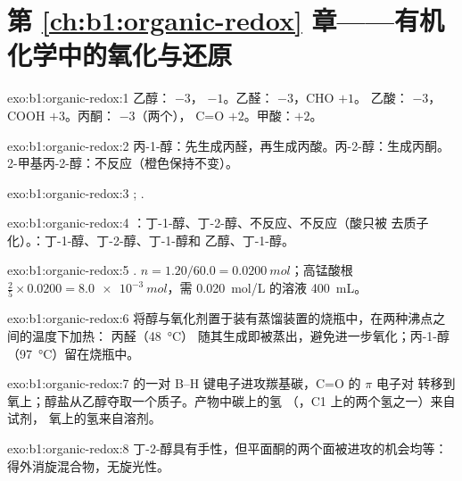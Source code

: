 \section*{第 \ref{ch:b1:organic-redox} 章——有机化学中的氧化与还原}

\begin{solution}{exo:b1:organic-redox:1}
乙醇： $-3$， $-1$。乙醛： $-3$，CHO $+1$。
乙酸： $-3$，COOH $+3$。丙酮： $-3$（两个），
C=O $+2$。甲酸：$+2$。
\end{solution}

\begin{solution}{exo:b1:organic-redox:2}
丙-1-醇：先生成丙醛，再生成丙酸。丙-2-醇：生成丙酮。
2-甲基丙-2-醇：不反应（橙色保持不变）。
\end{solution}

\begin{solution}{exo:b1:organic-redox:3}
;
.
\end{solution}

\begin{solution}{exo:b1:organic-redox:4}
：丁-1-醇、丁-2-醇、不反应、不反应（酸只被
去质子化）。：丁-1-醇、丁-2-醇、丁-1-醇和
乙醇、丁-1-醇。
\end{solution}

\begin{solution}{exo:b1:organic-redox:5}
.
$n = 1.20/60.0 = \qty{0.0200}{mol}$；高锰酸根 $\frac25 \times 0.0200 =
\qty{8.0e-3}{mol}$，需 \qty{0.020}{mol/L} 的溶液 \qty{400}{mL}。
\end{solution}

\begin{solution}{exo:b1:organic-redox:6}
将醇与氧化剂置于装有蒸馏装置的烧瓶中，在两种沸点之间的温度下加热：
丙醛（\qty{48}{\celsius}）
随其生成即被蒸出，避免进一步氧化；丙-1-醇
（\qty{97}{\celsius}）留在烧瓶中。
\end{solution}

\begin{solution}{exo:b1:organic-redox:7}
 的一对 B--H 键电子进攻羰基碳，C=O 的 $\pi$ 电子对
转移到氧上；醇盐从乙醇夺取一个质子。产物中碳上的氢
（，C1 上的两个氢之一）来自试剂，
氧上的氢来自溶剂。
\end{solution}

\begin{solution}{exo:b1:organic-redox:8}
丁-2-醇具有手性，但平面酮的两个面被进攻的机会均等：
得外消旋混合物，无旋光性。
\end{solution}

